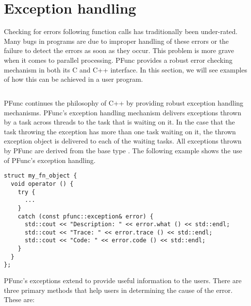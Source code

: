 \section{Exception handling}
\label{sec:exception}

Checking for errors following function calls has traditionally been
under-rated. Many bugs in programs are due to improper handling of these errors
or the failure to detect the errors as soon as they occur. This problem is more
grave when it comes to parallel processing. PFunc provides a robust error
checking mechanism in both its C and C++ interface. In this section, we will
see examples of how this can be achieved in a user program.

\subsection{\Cpp{}}
PFunc continues the philosophy of C++ by providing robust exception handling
mechanisms. PFunc's exception handling mechanism delivers exceptions thrown by
a task across threads to the task that is waiting on it. In the case that the
task throwing the exception has more than one task waiting on it, the thrown
exception object is delivered to each of the waiting tasks.  All exceptions
thrown by PFunc are derived from the base type . The
following example shows the use of PFunc's exception handling.

\begin{center}
\begin{minipage}{0.60\textwidth}
\begin{lstlisting}
struct my_fn_object { 
  void operator () { 
    try { 
      ... 
    }
    catch (const pfunc::exception& error) { 
      std::cout << "Description: " << error.what () << std::endl;
      std::cout << "Trace: " << error.trace () << std::endl; 
      std::cout << "Code: " << error.code () << std::endl;
    } 
  }
};
\end{lstlisting}
\end{minipage}
\end{center}

PFunc's exceptions extend  to provide useful information
to the users. There are three primary methods that help users in determining
the cause of the error. These are:

